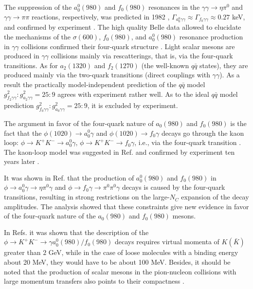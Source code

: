 \documentclass[aps,preprint,groupedaddress,floatfix]{revtex4}
\begin{document}
The suppression of the $a^0_0(980)$ and $f_0(980)$ resonances in
the $\gamma\gamma\to\eta\pi^0$ and $\gamma\gamma\to\pi\pi$
reactions, respectively, was predicted in 1982 \cite{fourQuarkGG},
$\Gamma_{a^0_0\gamma\gamma}\approx \Gamma_{f_0\gamma\gamma}\approx
0.27$ keV, and confirmed by experiment \cite{pdg-2018}. The high
quality Belle data  \cite{uehara2008,uehara2009} allowed to
elucidate the mechanisms of the $\sigma(600)$, $f_0(980)$, and
$a^0_0(980)$ resonance production in $\gamma\gamma$ collisions
confirmed their four-quark structure \cite{AS88,annsgnGamGam}.
Light scalar mesons are produced in $\gamma\gamma$ collisions
mainly via rescatterings, that is, via the four-quark transitions.
As for $a_2(1320)$ and $f_2(1270)$ (the well-known $q\bar q$
states), they are produced mainly via the two-quark transitions
(direct couplings with $\gamma\gamma$). As a result the
practically model-independent prediction of the  $q\bar q$ model
$g^2_{f_2\gamma\gamma}:g^2_{a_2\gamma\gamma}=25:9$ agrees with
experiment rather well. As to the ideal  $q\bar q$ model
prediction $g^2_{f_0\gamma\gamma}:g^2_{a_0\gamma\gamma}=25:9$, it
is excluded by experiment.

The argument in favor of the four-quark nature of $a_0(980)$ and
$f_0(980)$ is the fact that the $\phi(1020)\to a^0_0\gamma$ and
$\phi(1020)\to f_0\gamma$ decays go through the kaon loop:
$\phi\to K^+K^-\to a^0_0\gamma$, $\phi\to K^+K^-\to f_0\gamma$,
i.e., via the four-quark transition
\cite{achasov-89,achasov-97,a0f0,our_a0,achasov-03}. The kaon-loop
model was suggested in Ref. \cite{achasov-89} and confirmed by
experiment ten years later \cite{SNDa0,f0exp,kloea0}.

It was shown in Ref. \cite{achasov-03} that the production of
$a^0_0(980)$ and $f_0(980)$ in $\phi\to a^0_0\gamma\to
\eta\pi^0\gamma$ and $\phi\to f_0\gamma\to\pi^0\pi^0\gamma$ decays
is caused by the four-quark transitions, resulting in strong
restrictions on the large-$N_C$ expansion  of the decay
amplitudes. The analysis showed that these constraints give new
evidence in favor of the four-quark nature of the $a_0(980)$ and
$f_0(980)$ mesons.

In Refs. \cite{agsh,ak-07} it was shown that the description of
the $\phi\to K^+K^-\to\gamma a^0_0(980)/f_0(980)$ decays requires
virtual momenta of $K (\bar K)$ greater than $2$ GeV, while in the
case of loose molecules with a binding energy about 20 MeV, they
would have to be about 100 MeV. Besides, it should be noted that
the production of scalar mesons in the pion-nucleon collisions
with large momentum transfers also points to their compactness
\cite{ADS98}.
\end{document}
